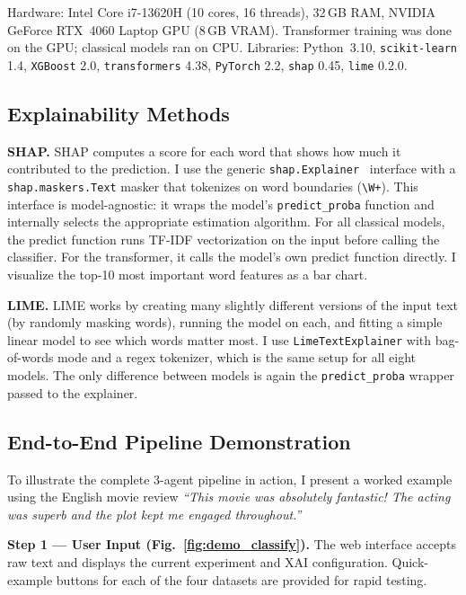 \documentclass[conference]{IEEEtran}
\begin{document}
Hardware: Intel Core i7-13620H (10 cores, 16 threads), 32\,GB RAM,
NVIDIA GeForce RTX~4060 Laptop GPU (8\,GB VRAM). Transformer training was done on the GPU;
classical models ran on CPU. Libraries: Python~3.10, \texttt{scikit-learn} 1.4,
\texttt{XGBoost} 2.0, \texttt{transformers} 4.38, \texttt{PyTorch} 2.2, \texttt{shap} 0.45,
\texttt{lime} 0.2.0.

\subsection{Explainability Methods}

\textbf{SHAP.} SHAP computes a score for each word that shows how much it contributed to
the prediction. I use the generic \texttt{shap.Explainer}~\cite{b4} interface with a
\texttt{shap.maskers.Text} masker that tokenizes on word boundaries (\texttt{\textbackslash W+}).
This interface is model-agnostic: it wraps the model's \texttt{predict\_proba} function and
internally selects the appropriate estimation algorithm. For all classical models, the
predict function runs TF-IDF vectorization on the input before calling the classifier. For
the transformer, it calls the model's own predict function directly. I visualize the top-10
most important word features as a bar chart.

\textbf{LIME.} LIME works by creating many slightly different versions of the input text
(by randomly masking words), running the model on each, and fitting a simple linear model
to see which words matter most. I use \texttt{LimeTextExplainer} with bag-of-words mode
and a regex tokenizer, which is the same setup for all eight models. The only difference
between models is again the \texttt{predict\_proba} wrapper passed to the explainer.

\subsection{End-to-End Pipeline Demonstration}
\label{sec:demo}

To illustrate the complete 3-agent pipeline in action, I present a worked example using the
English movie review \textit{``This movie was absolutely fantastic! The acting was superb and
the plot kept me engaged throughout.''}

\textbf{Step 1 — User Input (Fig.~\ref{fig:demo_classify}).} The web interface accepts raw text
and displays the current experiment and XAI configuration. Quick-example buttons for each of the
four datasets are provided for rapid testing.
\end{document}
